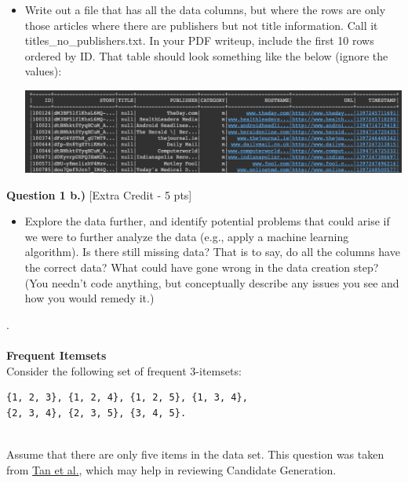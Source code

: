 \documentclass[paper=a4, fontsize=11pt]{scrartcl} %
\begin{document}
\begin{itemize}
    \item Write out a file that has all the data columns, but where the rows are only those articles where there are publishers but not title information. Call it titles\_no\_publishers.txt. In your PDF writeup, include the first 10 rows ordered by ID. That table should look something like the below (ignore the values): \\
    \begin{center}
    \includegraphics[width=150mm]{images/title_no_pub.png} \\    
    \end{center}
\end{itemize} 

{\Large \textbf{Question 1 b.)} [Extra Credit - 5 pts]} \\
\begin{itemize}
\item Explore the data further, and identify potential problems that could arise if we were to further analyze the data (e.g., apply a machine learning algorithm). Is there still missing data? That is to say, do all the columns have the correct data? What could have gone wrong in the data creation step? (You needn't code anything, but conceptually describe any issues you see and how you would remedy it.)
\end{itemize}
.\\
\\
{\huge \textbf{Frequent Itemsets}} \\

Consider the following set of frequent 3-itemsets:

\begin{verbatim}
{1, 2, 3}, {1, 2, 4}, {1, 2, 5}, {1, 3, 4}, 
{2, 3, 4}, {2, 3, 5}, {3, 4, 5}.
\end{verbatim} \\

Assume that there are only five items in the data set. This question was taken from \href{https://www-users.cse.umn.edu/~kumar001/dmbook/ch5_association_analysis.pdf}{Tan et al.}, which may help in reviewing Candidate Generation.\\
\end{document}
